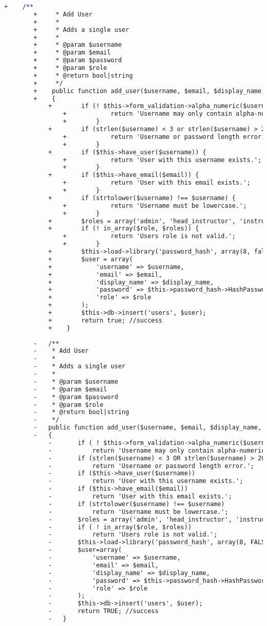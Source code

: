 \begin{lstlisting}[language=diff, caption=Perubahan pada kode User\_model.php]
		+    /**
		+     * Add User
		+     *
		+     * Adds a single user
		+     *
		+     * @param $username
		+     * @param $email
		+     * @param $password
		+     * @param $role
		+     * @return bool|string
		+     */
		+    public function add_user($username, $email, $display_name, $password, $role)
		+    {
			+        if (! $this->form_validation->alpha_numeric($username)) {
				+            return 'Username may only contain alpha-numeric characters.';
				+        }
			+        if (strlen($username) < 3 or strlen($username) > 20 or strlen($password) < 6 or strlen($password) > 200) {
				+            return 'Username or password length error.';
				+        }
			+        if ($this->have_user($username)) {
				+            return 'User with this username exists.';
				+        }
			+        if ($this->have_email($email)) {
				+            return 'User with this email exists.';
				+        }
			+        if (strtolower($username) !== $username) {
				+            return 'Username must be lowercase.';
				+        }
			+        $roles = array('admin', 'head_instructor', 'instructor', 'student');
			+        if (! in_array($role, $roles)) {
				+            return 'Users role is not valid.';
				+        }
			+        $this->load->library('password_hash', array(8, false));
			+        $user = array(
			+            'username' => $username,
			+            'email' => $email,
			+            'display_name' => $display_name,
			+            'password' => $this->password_hash->HashPassword($password),
			+            'role' => $role
			+        );
			+        $this->db->insert('users', $user);
			+        return true; //success
			+    }
		
		-	/**
		-	 * Add User
		-	 *
		-	 * Adds a single user
		-	 *
		-	 * @param $username
		-	 * @param $email
		-	 * @param $password
		-	 * @param $role
		-	 * @return bool|string
		-	 */
		-	public function add_user($username, $email, $display_name, $password, $role)
		-	{
			-		if ( ! $this->form_validation->alpha_numeric($username) )
			-			return 'Username may only contain alpha-numeric characters.';
			-		if (strlen($username) < 3 OR strlen($username) > 20 OR strlen($password) < 6 OR strlen($password) > 200)
			-			return 'Username or password length error.';
			-		if ($this->have_user($username))
			-			return 'User with this username exists.';
			-		if ($this->have_email($email))
			-			return 'User with this email exists.';
			-		if (strtolower($username) !== $username)
			-			return 'Username must be lowercase.';
			-		$roles = array('admin', 'head_instructor', 'instructor', 'student');
			-		if ( ! in_array($role, $roles))
			-			return 'Users role is not valid.';
			-		$this->load->library('password_hash', array(8, FALSE));
			-		$user=array(
			-			'username' => $username,
			-			'email' => $email,
			-			'display_name' => $display_name,
			-			'password' => $this->password_hash->HashPassword($password),
			-			'role' => $role
			-		);
			-		$this->db->insert('users', $user);
			-		return TRUE; //success
			-	}
		

\end{lstlisting}
